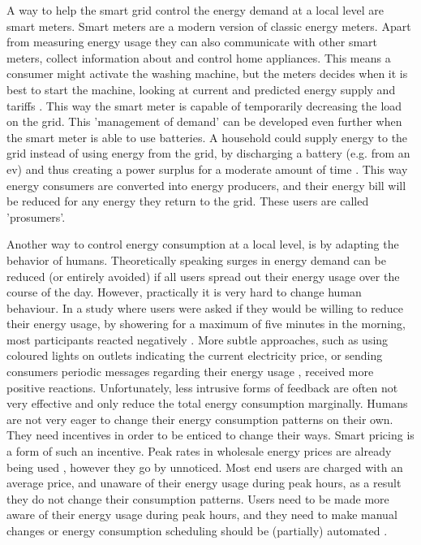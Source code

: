 A way to help the smart grid control the energy demand at a local level are smart meters. Smart meters are a modern version of classic energy meters. Apart from measuring energy usage they can also communicate with other smart meters, collect information about and control home appliances. This means a consumer might activate the washing machine, but the meters decides when it is best to start the machine, looking at current and predicted energy supply and tariffs  \cite{DepuruWangDevabhaktuni2011a}. This way the smart meter is capable of temporarily decreasing the load on the grid. This 'management of demand' can be developed even further when the smart meter is able to use batteries. A household could supply energy to the grid instead of using energy from the grid, by discharging a battery (e.g. from an \ac{ev}) and thus creating a power surplus for a moderate amount of time \cite{MwasiluJustoKimEtAl2014}. This way energy consumers are converted into energy producers, and their energy bill will be reduced for any energy they return to the grid. These users are called 'prosumers'.

Another way to control energy consumption at a local level, is by adapting the behavior of humans. Theoretically speaking surges in energy demand can be reduced (or entirely avoided) if all users spread out their energy usage over the course of the day. However, practically it is very hard to change human behaviour. In a study where users were asked if they would be willing to reduce their energy usage, by showering for a maximum of five minutes in the morning, most participants reacted negatively \cite{GouldenBedwellRennick-EgglestoneEtAl2014}. More subtle approaches, such as using coloured lights on outlets indicating the current electricity price, or sending consumers periodic messages regarding their energy usage \cite{AyresRasemanShih2012}, received more positive reactions. Unfortunately, less intrusive forms of feedback are often not very effective and only reduce the total energy consumption marginally. Humans are not very eager to change their energy consumption patterns on their own. They need incentives in order to be enticed to change their ways. Smart pricing is a form of such an incentive. Peak rates in wholesale energy prices are already being used \cite{SamadiMohsenian-RadSchoberEtAl2012}, however they go by unnoticed. Most end users are charged with an average price, and unaware of their energy usage during peak hours, as a result they do not change their consumption patterns. Users need to be made more aware of their energy usage during peak hours, and they need to make manual changes \cite{Mohsenian-RadLeon-Garcia2010} or energy consumption scheduling should be (partially) automated \cite{SamadiMohsenian-RadSchoberEtAl2012}.

